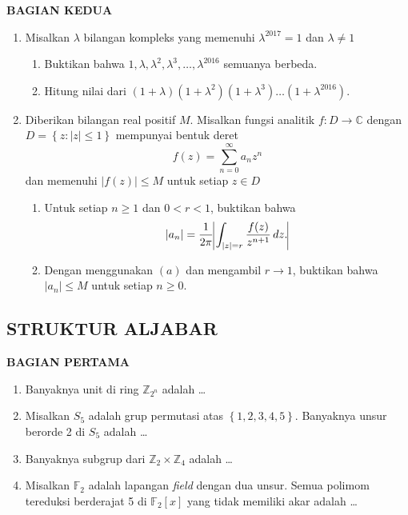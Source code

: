 \documentclass[12pt,twoside]{article}
\begin{document}
\newpage \textbf{BAGIAN KEDUA}
\begin{enumerate}
	\item Misalkan $\lambda$ bilangan kompleks yang memenuhi $\lambda^{2017} = 1$ dan $\lambda \neq 1$
	      \begin{enumerate}
		      \item Buktikan bahwa $1, \lambda, \lambda^2, \lambda^3,\dots,\lambda^{2016}$ semuanya berbeda.

		      \item Hitung nilai dari
		            \(
		            (1+\lambda)(1+\lambda^2)(1+\lambda^3)\dots(1+\lambda^{2016})\).
	      \end{enumerate}

	\item Diberikan bilangan real positif $M$. Misalkan fungsi analitik $f : D \to \mathbb{C}$ dengan $D=\left\lbrace z : |z| \leq 1 \right\rbrace$ mempunyai bentuk deret
	      \begin{equation*}
		      \displaystyle f(z) = \sum_{n=0}^{\infty} a_nz^n
	      \end{equation*}
	      dan memenuhi $|f(z)| \leq M$ untuk setiap $z \in D$
	      \begin{enumerate}
		      \item Untuk setiap $n \geq 1$ dan $0 < r< 1$, buktikan bahwa
		            \begin{equation*}
			            |a_n| = \displaystyle \dfrac{1}{2 \pi} \vline \int_{|z|=r}^{} \dfrac{f(z)}{z^{n+1}} \, dz. \vline
		            \end{equation*}

		      \item Dengan menggunakan $(a)$ dan mengambil $r \to 1$, buktikan bahwa $|a_n| \leq M$ untuk setiap $n \geq 0$.
	      \end{enumerate}
\end{enumerate}
\newpage

\subsection{STRUKTUR ALJABAR}
\textbf{BAGIAN PERTAMA}
\begin{enumerate}
	\item Banyaknya unit di ring $\mathbb{Z}_{2^n}$ adalah \dots

	\item Misalkan $S_5$ adalah grup permutasi atas $\left\lbrace 1,2,3,4,5 \right\rbrace$. Banyaknya unsur berorde 2 di $S_5$ adalah \dots

	\item Banyaknya subgrup dari $\mathbb{Z}_2 \times \mathbb{Z}_4$ adalah \dots

	\item Misalkan $\mathbb{F}_2$ adalah lapangan \textit{field} dengan dua unsur. Semua polimom tereduksi berderajat 5 di $\mathbb{F}_2[x]$ yang tidak memiliki akar adalah \dots
\end{enumerate}
\end{document}
